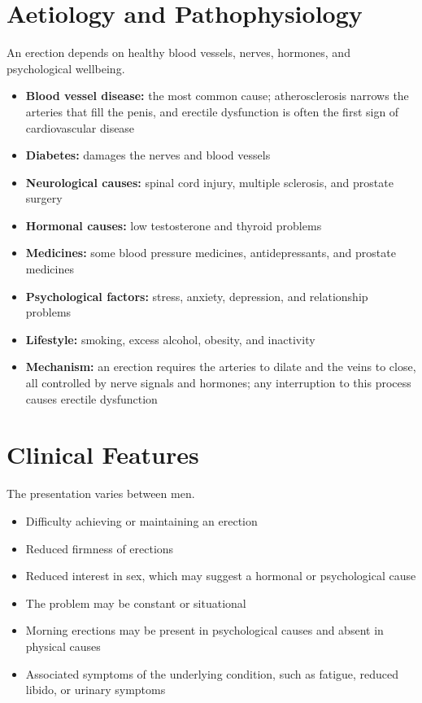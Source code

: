 \section*{Aetiology and Pathophysiology}
An erection depends on healthy blood vessels, nerves, hormones, and psychological wellbeing.
\begin{itemize}
    \item \textbf{Blood vessel disease:} the most common cause; atherosclerosis narrows the arteries that fill the penis, and erectile dysfunction is often the first sign of cardiovascular disease
    \item \textbf{Diabetes:} damages the nerves and blood vessels
    \item \textbf{Neurological causes:} spinal cord injury, multiple sclerosis, and prostate surgery
    \item \textbf{Hormonal causes:} low testosterone and thyroid problems
    \item \textbf{Medicines:} some blood pressure medicines, antidepressants, and prostate medicines
    \item \textbf{Psychological factors:} stress, anxiety, depression, and relationship problems
    \item \textbf{Lifestyle:} smoking, excess alcohol, obesity, and inactivity
    \item \textbf{Mechanism:} an erection requires the arteries to dilate and the veins to close, all controlled by nerve signals and hormones; any interruption to this process causes erectile dysfunction
\end{itemize}

\section*{Clinical Features}
The presentation varies between men.
\begin{itemize}
    \item Difficulty achieving or maintaining an erection
    \item Reduced firmness of erections
    \item Reduced interest in sex, which may suggest a hormonal or psychological cause
    \item The problem may be constant or situational
    \item Morning erections may be present in psychological causes and absent in physical causes
    \item Associated symptoms of the underlying condition, such as fatigue, reduced libido, or urinary symptoms
\end{itemize}

